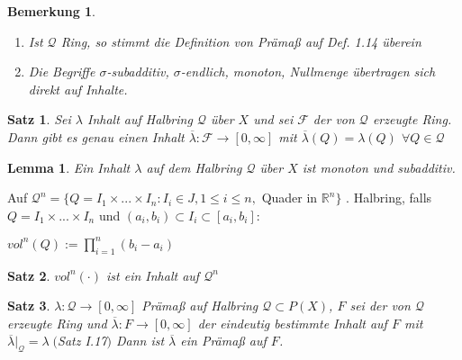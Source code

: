 \documentclass[11pt]{memoir}
\theoremstyle{changebreak}
\newtheorem{Bemerkung}{Bemerkung}[chapter]
\newtheorem{Lemma}{Lemma}[chapter]
\newtheorem{Satz}{Satz}[chapter]
\begin{document}
\begin{Bemerkung}
\begin{enumerate}
	\item Ist $\mathscr Q$ Ring, so stimmt die Definition von Prämaß auf \emph{Def. 1.14} überein
	\item Die Begriffe $\sigma$-subadditiv, $\sigma$-endlich, monoton, Nullmenge übertragen sich direkt auf Inhalte.
\end{enumerate}
\end{Bemerkung}

\begin{Satz}
Sei $\lambda$ Inhalt auf Halbring $\mathscr Q$ über $X$ und sei $\mathscr F$ der von $\mathscr Q$ erzeugte Ring. Dann gibt es genau einen Inhalt $\overline{\lambda}: \mathscr F \rightarrow [0, \infty]$ mit $\overline{\lambda}(Q) = \lambda(Q)$ $\forall Q \in \mathscr Q$
\end{Satz}


\begin{Lemma}
Ein Inhalt $\lambda$ auf dem Halbring $\mathscr Q$ über $X$ ist monoton und subadditiv.
\end{Lemma}

Auf $\mathscr Q^n = \{Q = I_1 \times ... \times I_n: I_i \in J, 1 \leq i \leq n, $ Quader in $\mathbb R^n \}$ .
Halbring, falls $Q = I_1 \times ... \times I_n$ und $(a_i, b_i) \subset I_i \subset [a_i, b_i]$:
\begin{center}
	$vol^n(Q) := \prod\limits_{i=1}^n (b_i - a_i)$
\end{center}

\begin{Satz}
$vol^n(\cdotp)$ ist ein Inhalt auf $\mathscr Q^n$
\end{Satz}

\begin{Satz}
$\lambda: \mathscr Q \rightarrow [0, \infty]$ Prämaß auf Halbring $\mathscr Q \subset P(X)$, $F$ sei der von $\mathscr Q$ erzeugte Ring und $\overline{\lambda}: F \rightarrow [0, \infty]$ der eindeutig bestimmte Inhalt auf $F$ mit $\overline{\lambda}|_\mathscr Q = \lambda \; ($Satz I.17$)$
Dann ist $\overline{\lambda}$ ein Prämaß auf $F$.
\end{Satz}
\end{document}
